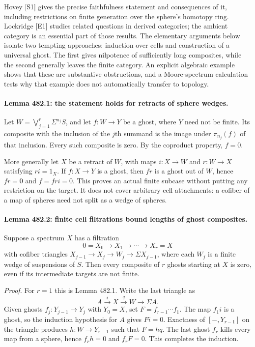 \documentclass[11pt]{article}
\begin{document}
Hovey [S1] gives the precise faithfulness statement and consequences of
it, including restrictions on finite generation over the sphere's
homotopy ring. Lockridge [E1] studies related questions in derived
categories; the ambient category is an essential part of those results.
The elementary arguments below isolate two tempting approaches: induction
over cells and construction of a universal ghost. The first gives
nilpotence of sufficiently long composites, while the second generally
leaves the finite category. An explicit algebraic example shows that
these are substantive obstructions, and a Moore-spectrum calculation
tests why that example does not automatically transfer to topology.

\paragraph{Lemma 482.1: the statement holds for retracts of sphere wedges.}
Let $W=\bigvee_{j=1}^r\Sigma^{n_j}S$, and let $f:W\to Y$ be a ghost,
where $Y$ need not be finite. Its composite with the inclusion of the
$j$th summand is the image under $\pi_{n_j}(f)$ of that inclusion.
Every such composite is zero. By the coproduct property, $f=0$.

More generally let $X$ be a retract of $W$, with maps $i:X\to W$ and
$r:W\to X$ satisfying $ri=1_X$. If $f:X\to Y$ is a ghost, then $fr$
is a ghost out of $W$, hence $fr=0$ and $f=fri=0$. This proves an
actual finite subcase without putting any restriction on the target.
It does not cover arbitrary cell attachments: a cofiber of a map of
spheres need not split as a wedge of spheres.

\paragraph{Lemma 482.2: finite cell filtrations bound lengths of ghost composites.}
Suppose a spectrum $X$ has a filtration
\[
 0=X_0\longrightarrow X_1\longrightarrow\cdots\longrightarrow X_r=X
\]
with cofiber triangles $X_{j-1}\to X_j\to W_j\to\Sigma X_{j-1}$,
where each $W_j$ is a finite wedge of suspensions of $S$. Then every
composite of $r$ ghosts starting at $X$ is zero, even if its intermediate
targets are not finite.

\emph{Proof.} For $r=1$ this is Lemma 482.1. Write the last triangle as
\[
             A\xrightarrow{i}X\xrightarrow{q}W\longrightarrow\Sigma A.
\]
Given ghosts $f_j:Y_{j-1}\to Y_j$ with $Y_0=X$, set
$F=f_{r-1}\cdots f_1$. The map $f_1i$ is a ghost, so the induction
hypothesis for $A$ gives $Fi=0$. Exactness of $[-,Y_{r-1}]$ on the
triangle produces $h:W\to Y_{r-1}$ such that $F=hq$. The last ghost
$f_r$ kills every map from a sphere, hence $f_rh=0$ and $f_rF=0$.
This completes the induction.
\end{document}

